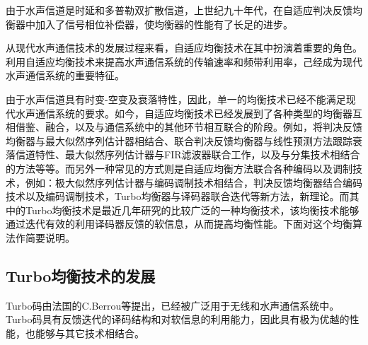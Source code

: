 由于水声信道是时延和多普勒双扩散信道，上世纪九十年代，在自适应判决反馈均衡器中加入了信号相位补偿器，使均衡器的性能有了长足的进步。

从现代水声通信技术的发展过程来看，自适应均衡技术在其中扮演着重要的角色。利用自适应均衡技术来提高水声通信系统的传输速率和频带利用率，己经成为现代水声通信系统的重要特征。

由于水声信道具有时变-空变及衰落特性，因此，单一的均衡技术已经不能满足现代水声通信系统的要求。如今，自适应均衡技术已经发展到了各种类型的均衡器互相借鉴、融合，以及与通信系统中的其他环节相互联合的阶段。例如，将判决反馈均衡器与最大似然序列估计器相结合\cite{LeNgoc1996}、联合判决反馈均衡器与线性预测方法跟踪衰落信道特性\cite{Blostein1995}、最大似然序列估计器与FIR滤波器联合工作\cite{Pasupathy1995}，以及与分集技术相结合的方法\cite{Taylor1995}等等。而另外一种常见的方式则是自适应均衡方法联合各种编码以及调制技术，例如：极大似然序列估计器与编码调制技术相结合\cite{stuber1997}\cite{Younis}，判决反馈均衡器结合编码技术以及编码调制技术\cite{Wang1996,Zhou1990,Yang2004}，Turbo均衡器与译码器联合迭代\cite{Magniez1999,Raphaeli1997,Vlahoyiannatos2001,Combined2000,Tuchler2002,Tuchler2011,Tuchler2002a,Xiang2003,Yang2007,Yang2005,Anastasopoulos1997,Hanzo2002,Ralf2004}等新方法，新理论。而其中的Turbo均衡技术是最近几年研究的比较广泛的一种均衡技术，该均衡技术能够通过迭代有效的利用译码器反馈的软信息，从而提高均衡性能。下面对这个均衡算法作简要说明。
\subsection{Turbo均衡技术的发展}
Turbo码由法国的C.Berrou\cite{berrou1993}等提出，已经被广泛用于无线和水声通信系统中。Turbo码具有反馈迭代的译码结构和对软信息的利用能力，因此具有极为优越的性能，也能够与其它技术相结合。

